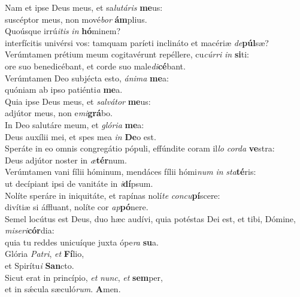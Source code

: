 \evenverse Nam et ipse Deus meus, et sa\textit{lu}\textit{tá}\textit{ris} \textbf{me}us:~\*\\
\evenverse suscéptor meus, non mové\textit{bor} \textbf{ám}plius.\\
\oddverse Quoúsque irrú\textit{i}\textit{tis} \textit{in} \textbf{hó}minem?~\*\\
\oddverse interfícitis univérsi vos: tamquam paríeti inclináto et macériæ \textit{de}\textbf{púl}sæ?\\
\evenverse Verúmtamen prétium meum cogitavérunt repéllere, cu\textit{cúr}\textit{ri} \textit{in} \textbf{si}ti:~\*\\
\evenverse ore suo benedicébant, et corde suo male\textit{di}\textbf{cé}bant.\\
\oddverse Verúmtamen Deo subjécta esto, \textit{á}\textit{ni}\textit{ma} \textbf{me}a:~\*\\
\oddverse quóniam ab ipso patiénti\textit{a} \textbf{me}a.\\
\evenverse Quia ipse Deus meus, et \textit{sal}\textit{vá}\textit{tor} \textbf{me}us:~\*\\
\evenverse adjútor meus, non e\textit{mi}\textbf{grá}bo.\\
\oddverse In Deo salutáre meum, et \textit{gló}\textit{ri}\textit{a} \textbf{me}a:~\*\\
\oddverse Deus auxílii mei, et spes mea \textit{in} \textbf{De}o est.\\
\evenverse Speráte in eo omnis congregátio pópuli, effúndite coram il\textit{lo} \textit{cor}\textit{da} \textbf{ve}stra:~\*\\
\evenverse Deus adjútor noster in \textit{æ}\textbf{tér}num.\\
\oddverse Verúmtamen vani fílii hóminum, mendáces fílii hómi\textit{num} \textit{in} \textit{sta}\textbf{té}ris:~\*\\
\oddverse ut decípiant ipsi de vanitáte in \textit{i}\textbf{dí}psum.\\
\evenverse Nolíte speráre in iniquitáte, et rapínas nolí\textit{te} \textit{con}\textit{cu}\textbf{pí}scere:~\*\\
\evenverse divítiæ si áffluant, nolíte cor \textit{ap}\textbf{pó}nere.\\
\oddverse Semel locútus est Deus, duo hæc audívi, quia potéstas Dei est, et tibi, Dómine, \textit{mi}\textit{se}\textit{ri}\textbf{cór}dia:~\*\\
\oddverse quia tu reddes unicuíque juxta ópe\textit{ra} \textbf{su}a.\\
\evenverse Glória \textit{Pa}\textit{tri}, \textit{et} \textbf{Fí}lio,~\*\\
\evenverse et Spirítu\textit{i} \textbf{San}cto.\\
\oddverse Sicut erat in princípio, \textit{et} \textit{nunc}, \textit{et} \textbf{sem}per,~\*\\
\oddverse et in sǽcula sæculó\textit{rum}. \textbf{A}men.\\
